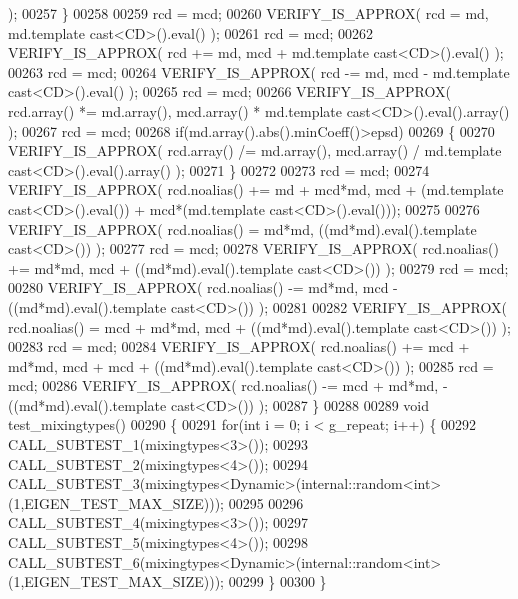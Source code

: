 \begin{DoxyCode}
      );
00257   \}
00258 
00259   rcd = mcd;
00260   VERIFY\_IS\_APPROX( rcd = md, md.template cast<CD>().eval() );
00261   rcd = mcd;
00262   VERIFY\_IS\_APPROX( rcd += md, mcd + md.template cast<CD>().eval() );
00263   rcd = mcd;
00264   VERIFY\_IS\_APPROX( rcd -= md, mcd - md.template cast<CD>().eval() );
00265   rcd = mcd;
00266   VERIFY\_IS\_APPROX( rcd.array() *= md.array(), mcd.array() * md.template cast<CD>().eval().array() );
00267   rcd = mcd;
00268   \textcolor{keywordflow}{if}(md.array().abs().minCoeff()>epsd)
00269   \{
00270     VERIFY\_IS\_APPROX( rcd.array() /= md.array(), mcd.array() / md.template cast<CD>().eval().array() );
00271   \}
00272 
00273   rcd = mcd;
00274   VERIFY\_IS\_APPROX( rcd.noalias() += md + mcd*md, mcd + (md.template cast<CD>().eval()) + mcd*(md.template 
      cast<CD>().eval()));
00275 
00276   VERIFY\_IS\_APPROX( rcd.noalias()  = md*md,       ((md*md).eval().template cast<CD>()) );
00277   rcd = mcd;
00278   VERIFY\_IS\_APPROX( rcd.noalias() += md*md, mcd + ((md*md).eval().template cast<CD>()) );
00279   rcd = mcd;
00280   VERIFY\_IS\_APPROX( rcd.noalias() -= md*md, mcd - ((md*md).eval().template cast<CD>()) );
00281 
00282   VERIFY\_IS\_APPROX( rcd.noalias()  = mcd + md*md,       mcd + ((md*md).eval().template cast<CD>()) );
00283   rcd = mcd;
00284   VERIFY\_IS\_APPROX( rcd.noalias() += mcd + md*md, mcd + mcd + ((md*md).eval().template cast<CD>()) );
00285   rcd = mcd;
00286   VERIFY\_IS\_APPROX( rcd.noalias() -= mcd + md*md,           - ((md*md).eval().template cast<CD>()) );
00287 \}
00288 
00289 \textcolor{keywordtype}{void} test\_mixingtypes()
00290 \{
00291   \textcolor{keywordflow}{for}(\textcolor{keywordtype}{int} i = 0; i < g\_repeat; i++) \{
00292     CALL\_SUBTEST\_1(mixingtypes<3>());
00293     CALL\_SUBTEST\_2(mixingtypes<4>());
00294     CALL\_SUBTEST\_3(mixingtypes<Dynamic>(internal::random<int>(1,EIGEN\_TEST\_MAX\_SIZE)));
00295 
00296     CALL\_SUBTEST\_4(mixingtypes<3>());
00297     CALL\_SUBTEST\_5(mixingtypes<4>());
00298     CALL\_SUBTEST\_6(mixingtypes<Dynamic>(internal::random<int>(1,EIGEN\_TEST\_MAX\_SIZE)));
00299   \}
00300 \}
\end{DoxyCode}
